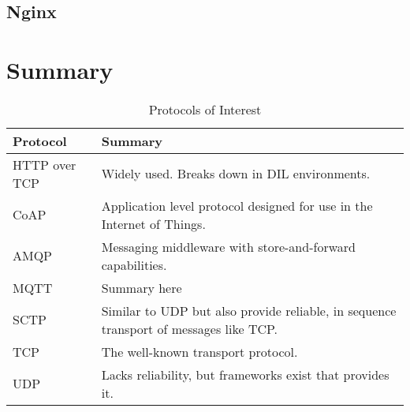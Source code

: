 \subsection{Nginx}


\section{Summary}


\begin{table}[h]
\begin{tabularx}{\textwidth}{| X | X |}
\hline
  \textbf{Protocol} & \textbf{Summary} \\ \hline
  HTTP over TCP & Widely used. Breaks down in DIL environments.\\ \hline
  CoAP & Application level protocol designed for use in the Internet of Things. \\ \hline
  AMQP & Messaging middleware with store-and-forward capabilities.\\ \hline
  MQTT & Summary here\\ \hline
  SCTP & Similar to UDP but also provide reliable, in sequence transport of messages like TCP. \\ \hline
  TCP & The well-known transport protocol. \\ \hline
  UDP & Lacks reliability, but frameworks exist that provides it. \\ \hline
\end{tabularx}
\caption{Protocols of Interest}
\end{table}
